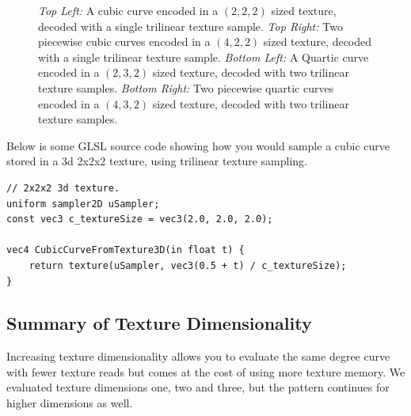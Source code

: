 \documentclass{jcgt}
\begin{document}
\begin{figure}

    \caption{\textit{Top Left:} A cubic curve encoded in a $(2,2,2)$ sized texture, decoded with a single trilinear texture sample. \textit{Top Right:}  Two piecewise cubic curves encoded in a $(4,2,2)$ sized texture, decoded with a single trilinear texture sample.  \textit{Bottom Left:} A Quartic curve encoded in a $(2,3,2)$ sized texture, decoded with two trilinear texture samples. \textit{Bottom Right:} Two piecewise quartic curves encoded in a $(4,3,2)$ sized texture, decoded with two trilinear texture samples.} 
    \label{fig:texlayeout3d}
  \end{figure}  

Below is some GLSL source code showing how you would sample a cubic curve stored in a 3d 2x2x2 texture, using trilinear texture sampling.

\begin{lstlisting}[caption={GLSL for evaluating a cubic curve encoded in a $(2,2,2)$ pixel 3d texture.  Trilinear texture sampling used to evaluate all three levels of the De Casteljeau algorithm.}, label={lst:GLSLCubicTexture3D}]
// 2x2x2 3d texture.
uniform sampler2D uSampler; 
const vec3 c_textureSize = vec3(2.0, 2.0, 2.0);

vec4 CubicCurveFromTexture3D(in float t) {
    return texture(uSampler, vec3(0.5 + t) / c_textureSize);
}
\end{lstlisting} 

\subsection{Summary of Texture Dimensionality}

Increasing texture dimensionality allows you to evaluate the same degree curve with fewer texture reads but comes at the cost of using more texture memory.  We evaluated texture dimensions one, two and three, but the pattern continues for higher dimensions as well.
\end{document}
